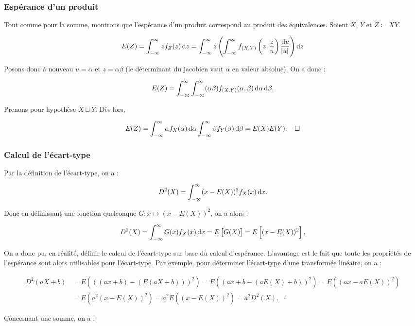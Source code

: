 \documentclass{article}
\begin{document}
		\subsubsection{Espérance d'un produit}
			Tout comme pour la somme, montrons que l'espérance d'un produit correspond au produit des équivalences. Soient $X$, $Y$ et $Z \coloneqq XY$.

			\[E(Z) = \int_{-\infty}^\infty zf_Z(z)\dif z = \int_{-\infty}^\infty z\left(\int_{-\infty}^\infty f_{(X, Y)}\left(z, \frac zu\right)\frac {\dif u}{\abs u}\right) \dif z\]

			Posons donc à nouveau $u = \alpha$ et $z = \alpha\beta$ (le déterminant du jacobien vaut $\alpha$ en valeur absolue). On a donc :

			\[E(Z) = \int_{-\infty}^\infty\int_{-\infty}^\infty(\alpha\beta)f_{(X, Y)}(\alpha, \beta)\dif\alpha\dif\beta.\]

			Prenons pour hypothèse $X \sqcup Y$. Dès lors,

			\[E(Z) = \int_{-\infty}^\infty\alpha f_X(\alpha)\dif\alpha\int_{-\infty}^\infty\beta f_Y(\beta)\dif\beta = E(X)E(Y).\;\;\;\;\square\]

		\subsubsection{Calcul de l'écart-type}
			Par la définition de l'écart-type, on a :

			\[D^2(X) = \int_{-\infty}^\infty (x-E(X))^2f_X(x)\dif x.\]

			Donc en définissant une fonction quelconque $G : x \mapsto (x-E(X))^2$, on a alors :

			\[D^2(X) = \int_{-\infty}^\infty G(x)f_X(x)\dif x = E\left[G(X)\right] = E\left[(x-E(X))^2\right].\]

			On a donc pu, en réalité, définir le calcul de l'écart-type sur base du calcul d'espérance. L'avantage est le fait que toute les propriétés de l'espérance sont alors
			utilisables pour l'écart-type. Par exemple, pour déterminer l'écart-type d'une transformée linéaire, on a :

			\[\begin{aligned}
				D^2(aX+b) &= E(((ax+b) - (E(aX+b)))^2) = E((ax+b-(aE(X)+b))^2) = E((ax-aE(X))^2) \\
						  &= E(a^2(x-E(X))^2) = a^2E((x-E(X))^2) = a^2D^2(X).\;\;\;\square
			\end{aligned}\]

			Concernant une somme, on a :
\end{document}
